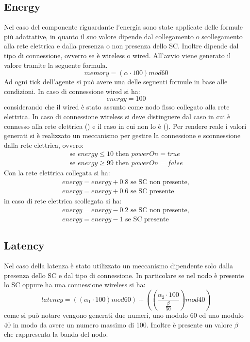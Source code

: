 \subsection{Energy}
Nel caso del componente riguardante l'energia sono state applicate delle formule più adattative, in quanto il suo valore dipende dal collegamento o scollegamento alla rete elettrica e dalla presenza o non presenza dello SC. Inoltre dipende dal tipo di connessione, ovverro se è wireless o wired. All'avvio viene generato il valore tramite la seguente formula.
\begin{equation}\label{eq:energy}
memory = (\alpha \cdot 100) mod 60
\end{equation}
Ad ogni tick dell'agente si può avere una delle seguenti formule in base alle condizioni. In caso di connessione wired si ha:
\begin{equation}
energy = 100
\end{equation}
considerando che il wired è stato assunto come nodo fisso collegato alla rete elettrica. In caso di connessione wireless si deve distinguere dal caso in cui è connesso alla rete elettrica () e il caso in cui non lo è (). Per rendere reale i valori generati si è realizzato un meccanismo per gestire la connessione e sconnessione dalla rete elettrica, ovvero:
\begin{gather}
\text{se }energy \leq 10\text{ then }powerOn = true \\
\text{se }energy \geq 99\text{ then }powerOn = false
\end{gather}
Con la rete elettrica collegata si ha:
\begin{gather}
energy = energy + 0.8 \text{ se SC non presente},\\
energy = energy + 0.6 \text{ se SC presente}
\end{gather}
in caso di rete elettrica scollegata si ha:
\begin{gather}
energy = energy - 0.2 \text{ se SC non presente},\\
energy = energy - 1 \text{ se SC presente}
\end{gather}
\subsection{Latency}
Nel caso della latenza è stato utilizzato un meccanismo dipendente solo dalla presenza dello SC e dal tipo di connessione. In particolare se nel nodo è presente lo SC oppure ha una connessione wireless si ha:
\begin{equation}
latency = ((\alpha_{1} \cdot 100)mod60) + \left( \left(\frac{\alpha_{2} \cdot 100}{\frac{\beta}{50}}\right)mod40\right)
\end{equation}
come si può notare vengono generati due numeri, uno modulo 60 ed uno modulo 40 in modo da avere un numero massimo di 100. Inoltre è presente un valore $\beta$ che rappresenta la banda del nodo.
